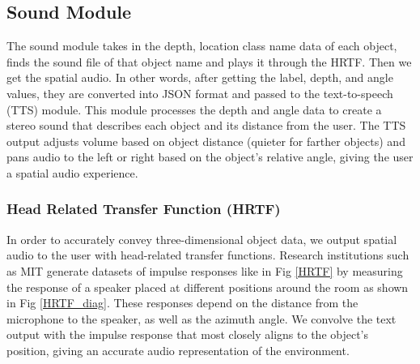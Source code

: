 \documentclass[12pt,a4paper]{article}
\begin{document}
\newpage
\subsection{Sound Module}
The sound module takes in the depth, location class name data of each object, finds the sound file of that object name and plays it through the HRTF.
Then we get the spatial audio. In other words, after getting the label, depth, and angle values, they are converted into JSON format and passed to the text-to-speech (TTS) module. This module processes the depth and angle data to create a stereo sound that describes each object and its distance from the user. The TTS output adjusts volume based on object distance (quieter for farther objects) and pans audio to the left or right based on the object's relative angle, giving the user a spatial audio experience.
\subsubsection{Head Related Transfer Function (HRTF)}
In order to accurately convey three-dimensional object data, we output spatial audio to the user with head-related transfer functions.
Research institutions such as MIT generate datasets of impulse responses like in Fig \ref{HRTF} by measuring the response of a speaker placed at different positions around the room as shown in Fig \ref{HRTF_diag}.
These responses depend on the distance from the microphone to the speaker, as well as the azimuth angle.
We convolve the text output with the impulse response that most closely aligns to the object’s position, giving an accurate audio representation of the environment.
\end{document}
